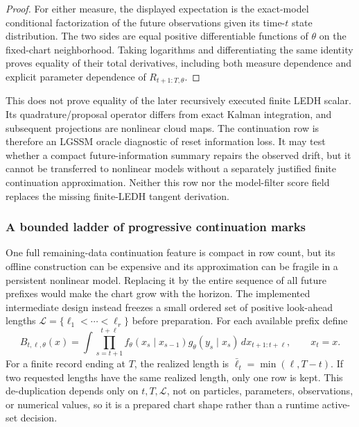 \begin{proof}
For either measure, the displayed expectation is the exact-model conditional
factorization of the future observations given its time-\(t\) state
distribution.  The two sides are equal positive differentiable functions of
\(\theta\) on the fixed-chart neighborhood.  Taking logarithms and
differentiating the same identity proves equality of their total derivatives,
including both measure dependence and explicit parameter dependence of
\(R_{t+1:T,\theta}\).
\end{proof}

This does not prove equality of the later recursively executed finite LEDH
scalar.  Its quadrature/proposal operator differs from exact Kalman integration,
and subsequent projections are nonlinear cloud maps.  The continuation row is
therefore an LGSSM oracle diagnostic of reset information loss.  It may test
whether a compact future-information summary repairs the observed drift, but it
cannot be transferred to nonlinear models without a separately justified
finite continuation approximation.  Neither this row nor the model-filter
score field replaces the missing finite-LEDH tangent derivation.

\subsubsection{A bounded ladder of progressive continuation marks}
\label{sec:bf-ledh-progressive-continuation-ladder}

One full remaining-data continuation feature is compact in row count, but its
offline construction can be expensive and its approximation can be fragile in
a persistent nonlinear model.  Replacing it by the entire sequence of all
future prefixes would make the chart grow with the horizon.  The implemented
intermediate design instead freezes a small ordered set of positive look-ahead
lengths
\(
  \mathcal L=\{\ell_1<\cdots<\ell_r\}
\)
before preparation.  For each available prefix define
\begin{equation}
\label{eq:bf-ledh-progressive-continuation-mark}
  B_{t,\ell,\theta}(x)
  =\int
    \prod_{s=t+1}^{t+\ell}
      f_\theta(x_s\mid x_{s-1})
      g_\theta(y_s\mid x_s)
    \,d x_{t+1:t+\ell},
  \qquad x_t=x.
\end{equation}
For a finite record ending at \(T\), the realized length is
\(
  \bar\ell_t=\min(\ell,T-t)
\).
If two requested lengths have the same realized length, only one row is kept.
This de-duplication depends only on \(t,T,\mathcal L\), not on particles,
parameters, observations, or numerical values, so it is a prepared chart shape
rather than a runtime active-set decision.

